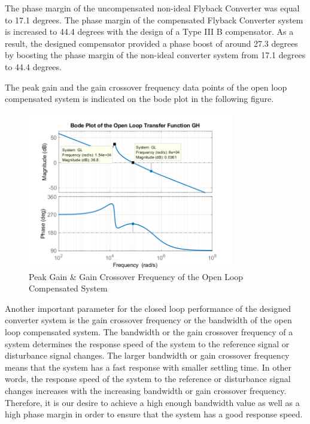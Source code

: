 The phase margin of the uncompensated non-ideal Flyback Converter was equal to 17.1 degrees. The phase margin of the compensated Flyback Converter system is increased to 44.4 degrees with the design of a Type III B compensator. As a result, the designed compensator provided a phase boost of around 27.3 degrees by boosting the phase margin of the non-ideal converter system from 17.1 degrees to 44.4 degrees.

The peak gain and the gain crossover frequency data points of the open loop compensated system is indicated on the bode plot in the following figure.

\begin{figure}[H]
\begin{center}
\includegraphics[width=0.8\textwidth]{bode_plots/OpenLoop_bode3.png}
\caption{Peak Gain \& Gain Crossover Frequency of the Open Loop Compensated System}
\label{com:openloop_bode3}
\end{center}
\end{figure}

Another important parameter for the closed loop performance of the designed converter system is the gain crossover frequency or the bandwidth of the open loop compensated system. The bandwidth or the gain crossover frequency of a system determines the response speed of the system to the reference signal or disturbance signal changes. The larger bandwidth or gain crossover frequency means that the system has a fast response with smaller settling time. In other words, the response speed of the system to the reference or disturbance signal changes increases with the increasing bandwidth or gain crossover frequency. Therefore, it is our desire to achieve a high enough bandwidth value as well as a high phase margin in order to ensure that the system has a good response speed.

